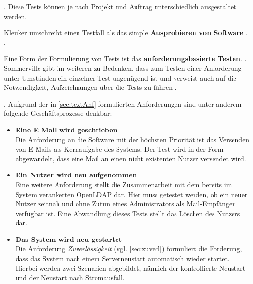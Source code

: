  \citep[][266]{Sommerville2012}. 
Diese Tests können je nach Projekt und Auftrag unterschiedlich ausgestaltet werden.  

Kleuker umschreibt einen Testfall als das simple \textbf{Ausprobieren von Software} \citep[vgl.][26]{Kleuker2019}. 
 \citep[][26]{Kleuker2019}.

Eine Form der Formulierung von Tests ist das \textbf{anforderungsbasierte Testen}.
 \citep[][266]{Sommerville2012}.
Sommerville gibt im weiteren zu Bedenken, dass zum Testen einer Anforderung unter Umständen ein einzelner Test ungenügend ist und verweist auch auf die Notwendigkeit, Aufzeichnungen über die Tests zu führen \citep[vgl.][267]{Sommerville2012}.

 \citep[][161]{Witte2019}. Aufgrund der in \autoref{sec:textAnf} formulierten Anforderungen sind unter anderem folgende Geschäftsprozesse denkbar:
\begin{itemize}
	\item \textbf{Eine E-Mail wird geschrieben}\\
	Die Anforderung an die Software mit der höchsten Priorität ist das Versenden von E-Mails als Kernaufgabe des Systems. Der Test wird  in der Form abgewandelt, dass eine Mail an einen nicht existenten Nutzer versendet wird.
	\item \textbf{Ein Nutzer wird neu aufgenommen}\\
	Eine weitere Anforderung stellt die Zusammenarbeit mit dem bereits im System verankerten OpenLDAP dar. Hier muss getestet werden, ob ein neuer Nutzer zeitnah und ohne Zutun eines Administrators als Mail-Empfänger verfügbar ist. Eine Abwandlung dieses Tests stellt das Löschen des Nutzers dar.
	\item \textbf{Das System wird neu gestartet} \\
	Die Anforderung \textit{Zuverlässigkeit} (vgl. \autoref{sec:zuverl}) formuliert die Forderung, dass das System nach einem Serverneustart automatisch wieder startet. Hierbei werden zwei Szenarien abgebildet, nämlich der kontrollierte Neustart und der Neustart nach Stromausfall.
\end{itemize}


